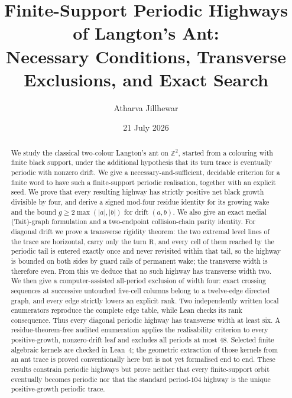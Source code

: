 \documentclass[11pt,reqno]{amsart}
\title[Finite-support periodic highways]{Finite-Support Periodic Highways of Langton's Ant:\\ Necessary Conditions, Transverse Exclusions, and Exact Search}
\author{Atharva Jillhewar}
\date{21 July 2026}
\theoremstyle{plain}
\theoremstyle{definition}
\newcommand{\Z}{\mathbb{Z}}
\newcommand{\growth}{g}
\newcommand{\turnR}{\mathrm{R}}
\begin{document}
\raggedbottom

\begin{abstract}
We study the classical two-colour Langton's ant on $\Z^2$, started from a
colouring with finite black support, under the additional hypothesis that its turn
trace is eventually periodic with nonzero drift. We give a necessary-and-sufficient,
decidable criterion for a finite word to have such a finite-support periodic
realisation, together with an explicit seed. We prove that every resulting highway
has strictly positive net black growth divisible by four, and derive a signed
mod-four residue identity for its growing wake and the bound
$\growth\ge2\max(|a|,|b|)$ for drift $(a,b)$. We also give an exact medial
(Tait)-graph formulation and a two-endpoint collision-chain parity identity. For
diagonal drift we prove a transverse rigidity theorem: the two extremal level lines
of the trace are horizontal, carry only the turn $\turnR$, and every cell of them
reached by the periodic tail is entered exactly once and never revisited within that
tail, so the highway is bounded on
both sides by guard rails of permanent wake; the transverse width is therefore even. From
this we deduce that no such highway has transverse width two.  We then give a
computer-assisted all-period exclusion of width four: exact crossing sequences at
successive untouched five-cell columns belong to a twelve-edge directed graph, and
every edge strictly lowers an explicit rank.  Two independently written local
enumerators reproduce the complete edge table, while Lean checks its rank
consequence.  Thus every diagonal periodic highway has transverse width at least
six. A
residue-theorem-free audited enumeration applies the realisability criterion
to every positive-growth, nonzero-drift leaf and excludes all periods at most $48$.
Selected finite algebraic kernels are checked in Lean~$4$; the geometric extraction
of those kernels from an ant trace is proved conventionally here but is not yet
formalised end to end. These results constrain periodic highways but prove neither
that every finite-support orbit eventually becomes periodic nor that the standard
period-$104$ highway is the unique positive-growth periodic trace.
\end{abstract}

\maketitle

\end{document}
